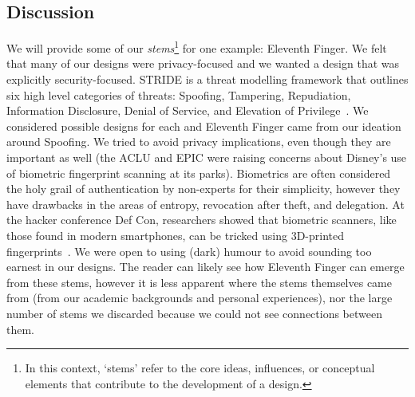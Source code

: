 
\subsection{Discussion}

We will provide some of our \textit{stems}\footnote{In this context, `stems' refer to the core ideas, influences, or conceptual elements that contribute to the development of a design.} for one example: Eleventh Finger.  We felt that many of our designs were privacy-focused and we wanted a design that was explicitly security-focused. STRIDE is a threat modelling framework that outlines six high level categories of threats: Spoofing, Tampering, Repudiation, Information Disclosure, Denial of Service, and Elevation of Privilege~\cite{shostack2014threat}. We considered possible designs for each and Eleventh Finger came from our ideation around Spoofing. We tried to avoid privacy implications, even though they are important as well (the ACLU and EPIC were raising concerns about Disney's use of biometric fingerprint scanning at its parks). Biometrics are often considered the holy grail of authentication by non-experts for their simplicity, however they have drawbacks in the areas of entropy, revocation after theft, and delegation. At the hacker conference Def Con, researchers showed that biometric scanners, like those found in modern smartphones, can be tricked using 3D-printed fingerprints~\cite{levalle2020biometric}. We were open to using (dark) humour to avoid sounding too earnest in our designs. The reader can likely see how Eleventh Finger can emerge from these stems, however it is less apparent where the stems themselves came from (\eg from our academic backgrounds and personal experiences), nor the large number of stems we discarded because we could not see connections between them. 


